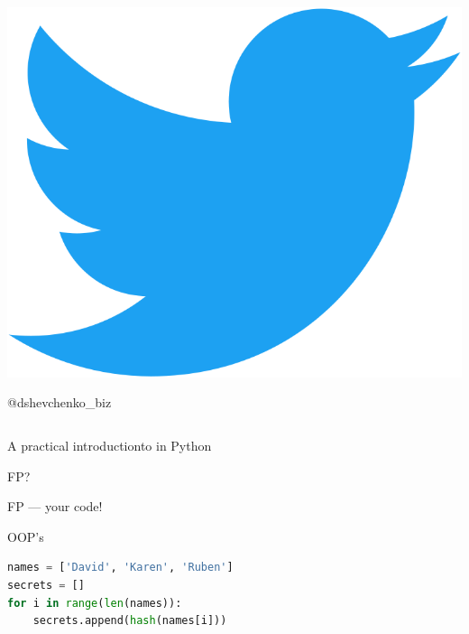 \documentclass[aspectratio=169]{beamer}
\begin{document}
\begin{frame}
\begin{columns}[c]
\begin{column}[c]{15em}
            \begin{minipage}{1.5em}
                \includegraphics[scale=0.02]{img/twitter.png}
            \end{minipage}
            \begin{minipage}{6em}
                \large
                    @dshevchenko\_biz
            \end{minipage}

            \vspace{5em}
        \end{column}
    \end{columns}
\end{frame}

\begin{frame}
    \HUGE
        A practical introduction\newline to  in Python
\end{frame}

\begin{frame}
    \centering
        \HUGE
            FP?
\end{frame}

\begin{frame}
    \HUGE
        FP ---  your code!
\end{frame}

\begin{frame}[fragile,t]
    \vspace{0.8em}
    \Huge{OOP's }

    \begin{lstlisting}[language=Python]
names = ['David', 'Karen', 'Ruben']
secrets = []
for i in range(len(names)):
    secrets.append(hash(names[i]))
    \end{lstlisting}
\end{frame}
\end{document}
